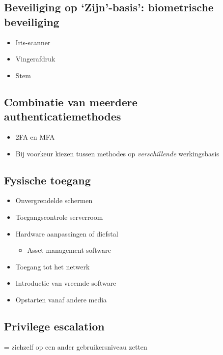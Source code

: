 \documentclass{article}
\begin{document}
\subsection{Beveiliging op `Zijn'-basis': biometrische beveiliging}

\begin{itemize}
    \item Iris-scanner
    \item Vingerafdruk
    \item Stem
\end{itemize}

\subsection{Combinatie van meerdere authenticatiemethodes}

\begin{itemize}
    \item 2FA en MFA
    \item Bij voorkeur kiezen tussen methodes op \textit{verschillende} werkingsbasis
\end{itemize}

\subsection{Fysische toegang}

\begin{itemize}
    \item Onvergrendelde schermen
    \item Toegangscontrole serverroom
    \item Hardware aanpassingen of diefstal
    \begin{itemize}
        \item Asset management software
    \end{itemize}
    \item Toegang tot het netwerk
    \item Introductie van vreemde software
    \item Opstarten vanaf andere media
\end{itemize}

\subsection{Privilege escalation}

= zichzelf op een ander gebruikersniveau zetten
\end{document}
